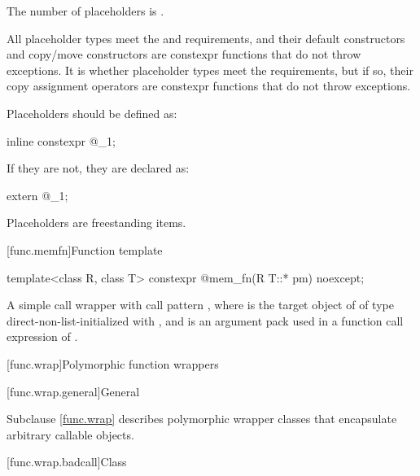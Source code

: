 \pnum
The number  of placeholders is
.

\pnum
All placeholder types meet the  and
 requirements, and
their default constructors and copy/move
constructors are constexpr functions that
do not throw exceptions. It is  whether
placeholder types meet the  requirements,
but if so, their copy assignment operators are
constexpr functions that do not throw exceptions.

\pnum
Placeholders should be defined as:
\begin{codeblock}
inline constexpr @\unspec@ _1{};
\end{codeblock}
If they are not, they are declared as:
\begin{codeblock}
extern @\unspec@ _1;
\end{codeblock}%

\pnum
{}%
Placeholders are freestanding items.

[func.memfn]{Function template }%

%
\begin{itemdecl}
template<class R, class T> constexpr @\unspec@ mem_fn(R T::* pm) noexcept;
\end{itemdecl}

\begin{itemdescr}
\pnum
\returns
A simple call wrapper 
with call pattern , where
 is the target object of  of type 
direct-non-list-initialized with , and
 is an argument pack
used in a function call expression of .
\end{itemdescr}

[func.wrap]{Polymorphic function wrappers}%

[func.wrap.general]{General}%

\pnum
Subclause \ref{func.wrap} describes polymorphic wrapper classes that
encapsulate arbitrary callable objects.

[func.wrap.badcall]{Class }%
%

